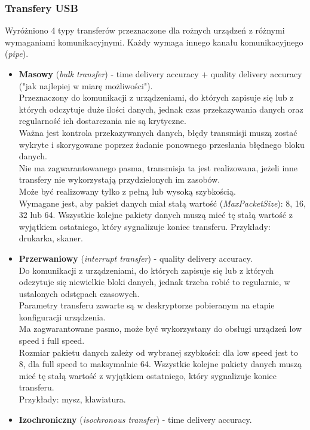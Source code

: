 		\subsubsection{Transfery USB}
		Wyróżniono 4 typy transferów przeznaczone dla rożnych urządzeń z różnymi wymaganiami komunikacyjnymi. Każdy wymaga innego kanału komunikacyjnego (\emph{pipe}).
		\begin{itemize}
			\item \textbf{Masowy} (\emph{bulk transfer}) - time delivery accuracy + quality delivery accuracy ("jak najlepiej w miarę możliwości").\\
			Przeznaczony do komunikacji z urządzeniami, do których zapisuje się lub z których odczytuje duże ilości danych, jednak czas przekazywania danych oraz regularność ich dostarczania nie są krytyczne.\\
			Ważna jest kontrola przekazywanych danych, błędy transmisji muszą zostać wykryte i skorygowane poprzez żadanie ponownego przesłania błędnego bloku danych.\\
			Nie ma zagwarantowanego pasma, transmisja ta jest realizowana, jeżeli inne transfery nie wykorzystają przydzielonych im zasobów.\\
			Może być realizowany tylko z pełną lub wysoką szybkością.\\
			Wymagane jest, aby pakiet danych miał stałą wartość (\emph{MaxPacketSize}): 8, 16, 32 lub 64. Wszystkie kolejne pakiety danych muszą mieć tę stałą wartość z wyjątkiem ostatniego, który sygnalizuje koniec transferu.
			Przykłady: drukarka, skaner.
			\item \textbf{Przerwaniowy} (\emph{interrupt transfer}) - quality delivery accuracy.\\
			Do komunikacji z urządzeniami, do których zapisuje się lub z których odczytuje się niewielkie bloki danych, jednak trzeba robić to regularnie, w ustalonych odstępach czasowych.\\
			Parametry transferu zawarte są w deskryptorze pobieranym na etapie konfiguracji urządzenia.\\
			Ma zagwarantowane pasmo, może być wykorzystany do obsługi urządzeń low speed i full speed.\\
			Rozmiar pakietu danych zależy od wybranej szybkości: dla low speed jest to 8, dla full speed to maksymalnie 64. Wszystkie kolejne pakiety danych muszą mieć tę stałą wartość z wyjątkiem ostatniego, który sygnalizuje koniec transferu.\\
			Przykłady: mysz, klawiatura.
			\item \textbf{Izochroniczny} (\emph{isochronous transfer}) - time delivery accuracy.\\

\end{itemize}

